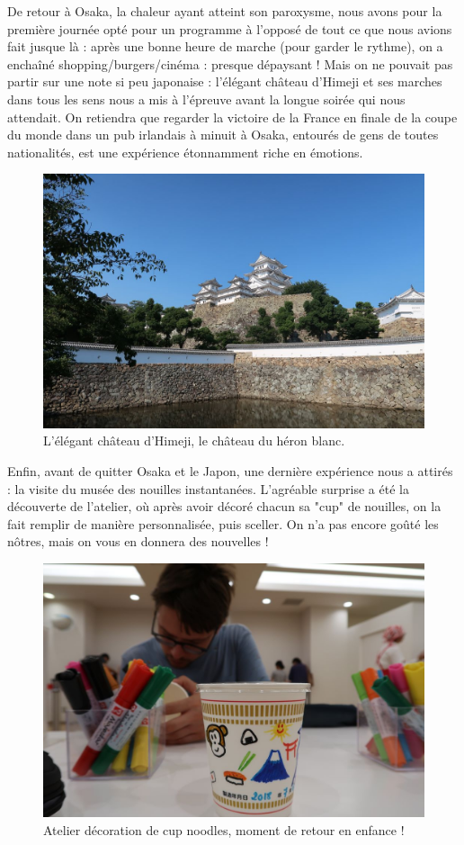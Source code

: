 De retour à Osaka, la chaleur ayant atteint son paroxysme, nous avons
pour la première journée opté pour un programme à l'opposé de tout ce
que nous avions fait jusque là : après une bonne heure de marche (pour
garder le rythme), on a enchaîné shopping/burgers/cinéma : presque
dépaysant ! Mais on ne pouvait pas partir sur une note si peu japonaise
: l'élégant château d'Himeji et ses marches dans tous les sens nous a
mis à l'épreuve avant la longue soirée qui nous attendait. On retiendra
que regarder la victoire de la France en finale de la coupe du monde
dans un pub irlandais à minuit à Osaka, entourés de gens de toutes
nationalités, est une expérience étonnamment riche en émotions.

\begin{figure}
\centering
\includegraphics{images/20180723_himeji.JPG}
\caption{L'élégant château d'Himeji, le château du héron blanc.}
\end{figure}

Enfin, avant de quitter Osaka et le Japon, une dernière expérience nous
a attirés : la visite du musée des nouilles instantanées. L'agréable
surprise a été la découverte de l'atelier, où après avoir décoré chacun
sa "cup" de nouilles, on la fait remplir de manière personnalisée, puis
sceller. On n'a pas encore goûté les nôtres, mais on vous en donnera des
nouvelles !

\begin{figure}
\centering
\includegraphics{images/20180723_noodles.JPG}
\caption{Atelier décoration de cup noodles, moment de retour en enfance
!}
\end{figure}

